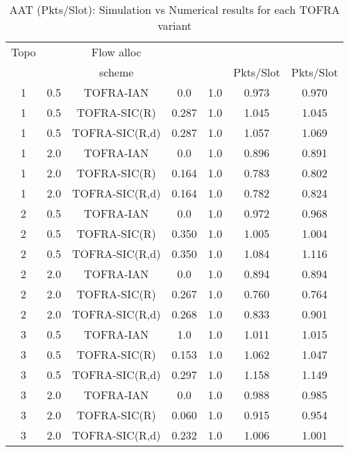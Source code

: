 \documentclass[conference]{IEEEtran}
\begin{document}
\begin{table}[t]
\begin{center}
\begin{tabular}{|c|c|c|c|c|c|c|}
\hline
Topo &  & Flow alloc &  &  &  & \\
 &  & scheme &  &  &  Pkts/Slot& Pkts/Slot\\ \hline
1 & 0.5 & TOFRA-IAN &  0.0 &  1.0 &  0.973 & 0.970 \\ \hline
1 & 0.5 & TOFRA-SIC(R) &  0.287 & 1.0  & 1.045 & 1.045 \\ \hline
1 & 0.5 & TOFRA-SIC(R,d) &  0.287 & 1.0 & 1.057 & 1.069 \\ \hline
1 & 2.0 & TOFRA-IAN & 0.0 & 1.0 & 0.896 & 0.891 \\ \hline
1 & 2.0 & TOFRA-SIC(R) &  0.164 & 1.0 & 0.783 & 0.802 \\ \hline
1 & 2.0 & TOFRA-SIC(R,d) & 0.164 & 1.0 & 0.782 & 0.824 \\ \hline \hline
2 & 0.5 & TOFRA-IAN & 0.0 & 1.0 & 0.972 & 0.968 \\ \hline
2 & 0.5 & TOFRA-SIC(R) & 0.350 & 1.0 & 1.005 & 1.004 \\ \hline
2 & 0.5 & TOFRA-SIC(R,d) & 0.350 & 1.0 & 1.084 & 1.116 \\ \hline
2 & 2.0 & TOFRA-IAN & 0.0 & 1.0 & 0.894 & 0.894 \\ \hline
2 & 2.0 & TOFRA-SIC(R) & 0.267 & 1.0 &  0.760 & 0.764 \\ \hline
2 & 2.0 & TOFRA-SIC(R,d) & 0.268 & 1.0 & 0.833  & 0.901 \\ \hline \hline
3 & 0.5 & TOFRA-IAN &  1.0 & 1.0 & 1.011 & 1.015 \\ \hline
3 & 0.5 & TOFRA-SIC(R) & 0.153 & 1.0 & 1.062 & 1.047 \\ \hline
3 & 0.5 & TOFRA-SIC(R,d) & 0.297 & 1.0 & 1.158 & 1.149 \\ \hline
3 & 2.0 & TOFRA-IAN &  0.0 & 1.0 & 0.988  & 0.985 \\ \hline
3 & 2.0 & TOFRA-SIC(R) & 0.060 & 1.0 & 0.915 & 0.954 \\ \hline
3 & 2.0 & TOFRA-SIC(R,d) & 0.232 & 1.0 & 1.006 & 1.001 \\ \hline
\end{tabular}
\end{center}
\caption{AAT (Pkts/Slot): Simulation vs Numerical results for each TOFRA variant}
\label{tab:tofra_num_sim}
\end{table}
\end{document}
